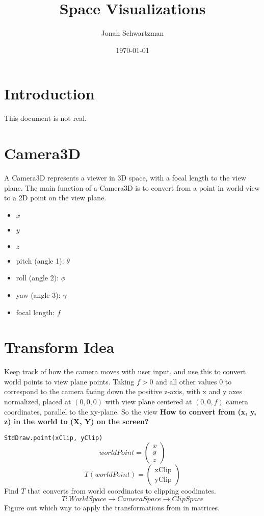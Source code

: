 \documentclass{article}
\begin{document}
\title{Space Visualizations}
\author{Jonah Schwartzman}
\date{\today}

\maketitle

\section{Introduction}
This document is not real.

\section{Camera3D}
A Camera3D represents a viewer in 3D space, with a focal length to the view plane. The main function of a Camera3D is to convert from a point in world view to a 2D point on the view plane.
\begin{itemize}
    \item $x$
    \item $y$
    \item $z$
    \item pitch (angle 1): $\theta$
    \item roll (angle 2): $\phi$
    \item yaw (angle 3): $\gamma$
    \item focal length: $f$
\end{itemize}

\section{Transform Idea}
Keep track of how the camera moves with user input, and use this to convert world points to view plane points.
\newline\newline Taking $f > 0$ and all other values 0 to correspond to the camera facing down the positive z-axis, with x and y axes normalized, placed at $(0,0,0)$ with view plane centered at $(0, 0, f)$ camera coordinates, parallel to the xy-plane. So the view
\newline\newline \textbf{How to convert from (x, y, z) in the world to (X, Y) on the screen?}

    \texttt{StdDraw.point(xClip, yClip)}
    \[worldPoint =  \begin{pmatrix}
    x \\ y \\ z
    \end{pmatrix}\]
    \[T(worldPoint) = \begin{pmatrix}
    \text{xClip} \\ \text{yClip}
    \end{pmatrix}\]
Find $T$ that converts from world coordinates to clipping coodinates.
\[T: WorldSpace \longrightarrow CameraSpace \longrightarrow ClipSpace\]
Figure out which way to apply the transformations from in matrices.
\end{document}
